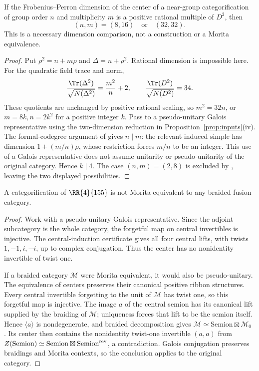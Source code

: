 \begin{proposition}
\label{prop:155-neargroup-dimensions}
If the Frobenius--Perron dimension of the center of a near-group
categorification of group order $n$ and multiplicity $m$ is a positive
rational multiple of $D^2$, then
\[
 (n,m)=(8,16)\quad\text{or}\quad(32,32).
\]
This is a necessary dimension comparison, not a construction or a
Morita equivalence.
\end{proposition}
\begin{proof}
Put $\rho^2=n+m\rho$ and $\Delta=n+\rho^2$. Rational dimension is
impossible here. For the quadratic field trace and norm,
\[
 \frac{\Tr(\Delta^2)}{\sqrt{N(\Delta^2)}}
   =\frac{m^2}{n}+2,
 \qquad
 \frac{\Tr(D^2)}{\sqrt{N(D^2)}}=34.
\]
These quotients are unchanged by positive rational scaling, so
$m^2=32n$, or $m=8k,n=2k^2$ for a positive integer $k$.
Pass to a pseudo-unitary Galois representative using the two-dimension
reduction in Proposition~\ref{prop:inputs}(iv).
The formal-codegree argument of \cite[Proposition~3.3]{SchTwo} gives
$n\mid m$: the relevant induced simple has dimension
$1+(m/n)\rho$, whose restriction forces $m/n$ to be an integer.
This use of a Galois representative does not assume unitarity or
pseudo-unitarity of the original category. Hence $k\mid4$.
The case $(n,m)=(2,8)$ is excluded by
\cite[Theorem~1.1]{SchTwo}, leaving the two displayed possibilities.
\end{proof}


\begin{proposition}
\label{prop:155-no-braided-morita}
A categorification of $\RR{4}{155}$ is not Morita equivalent to any
braided fusion category.
\end{proposition}
\begin{proof}
Work with a pseudo-unitary Galois representative. Since the adjoint
subcategory is the whole category, the forgetful map on central
invertibles is injective. The central-induction certificate gives all four
central lifts, with twists $1,-1,i,-i$, up to complex conjugation.
Thus the center has no nonidentity invertible of twist one.

If a braided category $\mathcal M$ were Morita equivalent, it would
also be pseudo-unitary. The equivalence of centers preserves their
canonical positive ribbon structures. Every central invertible
forgetting to the unit of $\mathcal M$ has twist one, so this
forgetful map is injective. The image $a$ of the central semion has
its canonical lift supplied by the braiding of $\mathcal M$; uniqueness
forces that lift to be the semion itself. Hence $\langle a\rangle$
is nondegenerate, and braided decomposition gives
$\mathcal M\simeq\mathrm{Semion}\boxtimes\mathcal M_0$
\cite{DGNO}. Its center then contains the nonidentity twist-one
invertible $(a,a)$ from
$Z(\mathrm{Semion})\simeq\mathrm{Semion}\boxtimes\mathrm{Semion}^{\rm rev}$,
a contradiction. Galois conjugation preserves braidings and Morita
contexts, so the conclusion applies to the original category.
\end{proof}
